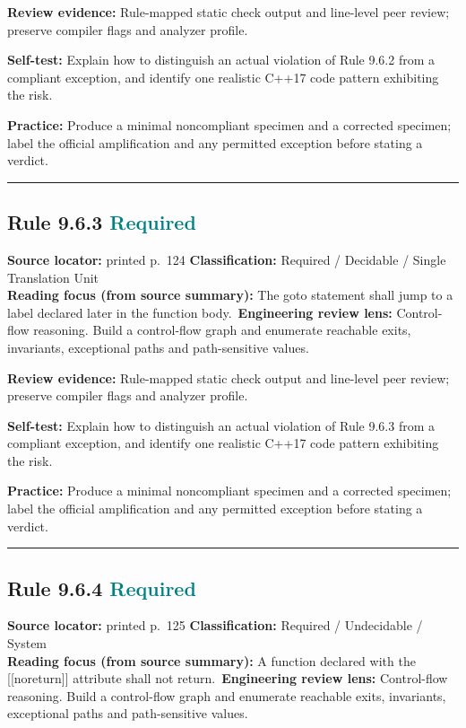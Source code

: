 \documentclass[10pt,letterpaper]{article}
\begin{document}
\textbf{Review evidence:} Rule-mapped static check output and line-level peer review; preserve compiler flags and analyzer profile.

\textbf{Self-test:} Explain how to distinguish an actual violation of Rule 9.6.2 from a compliant exception, and identify one realistic C++17 code pattern exhibiting the risk.\par
\textbf{Practice:} Produce a minimal noncompliant specimen and a corrected specimen; label the official amplification and any permitted exception before stating a verdict.
\smallskip\hrule\smallskip
\subsection*{Rule 9.6.3 \enspace \texorpdfstring{\small\textcolor{teal}{Required}}{Required}}
\noindent\textbf{Source locator:} printed p.~124 \quad\textbf{Classification:} Required / Decidable / Single Translation Unit\\
\textbf{Reading focus (from source summary):} The goto statement shall jump to a label declared later in the function body.\
\textbf{Engineering review lens:} Control-flow reasoning. Build a control-flow graph and enumerate reachable exits, invariants, exceptional paths and path-sensitive values.

\textbf{Review evidence:} Rule-mapped static check output and line-level peer review; preserve compiler flags and analyzer profile.

\textbf{Self-test:} Explain how to distinguish an actual violation of Rule 9.6.3 from a compliant exception, and identify one realistic C++17 code pattern exhibiting the risk.\par
\textbf{Practice:} Produce a minimal noncompliant specimen and a corrected specimen; label the official amplification and any permitted exception before stating a verdict.
\smallskip\hrule\smallskip
\subsection*{Rule 9.6.4 \enspace \texorpdfstring{\small\textcolor{teal}{Required}}{Required}}
\noindent\textbf{Source locator:} printed p.~125 \quad\textbf{Classification:} Required / Undecidable / System\\
\textbf{Reading focus (from source summary):} A function declared with the [[noreturn]] attribute shall not return.\
\textbf{Engineering review lens:} Control-flow reasoning. Build a control-flow graph and enumerate reachable exits, invariants, exceptional paths and path-sensitive values.
\end{document}

